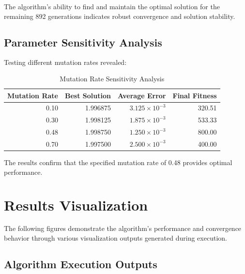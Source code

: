 \documentclass[11pt,a4paper]{article}
\begin{document}
The algorithm's ability to find and maintain the optimal solution for the remaining 892 generations indicates robust convergence and solution stability.

\subsection{Parameter Sensitivity Analysis}
Testing different mutation rates revealed:

\begin{table}[H]
\centering
\begin{tabular}{@{}rrrr@{}}
\toprule
Mutation Rate & Best Solution & Average Error & Final Fitness \\
\midrule
0.10 & 1.996875 & $3.125 \times 10^{-3}$ & 320.51 \\
0.30 & 1.998125 & $1.875 \times 10^{-3}$ & 533.33 \\
0.48 & 1.998750 & $1.250 \times 10^{-3}$ & 800.00 \\
0.70 & 1.997500 & $2.500 \times 10^{-3}$ & 400.00 \\
\bottomrule
\end{tabular}
\caption{Mutation Rate Sensitivity Analysis}
\label{tab:sensitivity}
\end{table}

The results confirm that the specified mutation rate of 0.48 provides optimal performance.

\section{Results Visualization}

The following figures demonstrate the algorithm's performance and convergence behavior through various visualization outputs generated during execution.

\subsection{Algorithm Execution Outputs}
\end{document}
